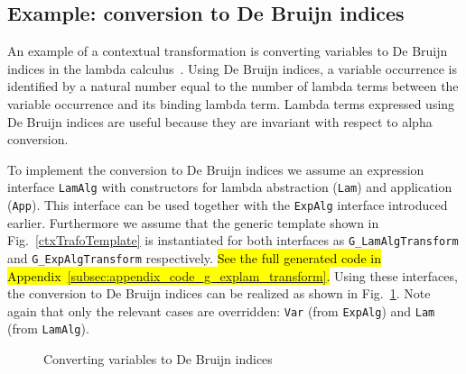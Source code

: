 \subsection{Example: conversion to De Bruijn indices}

An example of a contextual transformation is converting variables to De Bruijn indices in the lambda calculus~\cite{deBruijn1972381}.
Using De Bruijn indices, a variable occurrence is identified by a natural number equal to the number of lambda terms between the variable occurrence and its binding lambda term.
Lambda terms expressed using De Bruijn indices are useful because they are invariant with respect to alpha conversion.

To implement the conversion to De Bruijn indices we assume an expression interface \lstinline{LamAlg} with constructors for lambda abstraction (\lstinline{Lam}) and application (\lstinline{App}).
This interface can be used together with the \lstinline{ExpAlg} interface introduced earlier.
Furthermore we assume that the generic template shown in Fig.~\ref{ctxTrafoTemplate} is instantiated for both interfaces as \lstinline{G_LamAlgTransform} and \lstinline{G_ExpAlgTransform} respectively. \hl{See the full generated code in Appendix~\ref{subsec:appendix_code_g_explam_transform}.}
Using these interfaces, the conversion to De Bruijn indices can be realized as shown in Fig.~\ref{DeBruijn}.
Note again that only the relevant cases are overridden: \lstinline{Var} (from \lstinline{ExpAlg}) and \lstinline{Lam} (from \lstinline{LamAlg}).


\begin{figure}[t]
\nocaptionrule
\caption{Converting variables to De Bruijn indices}
\label{DeBruijn}
\end{figure}




